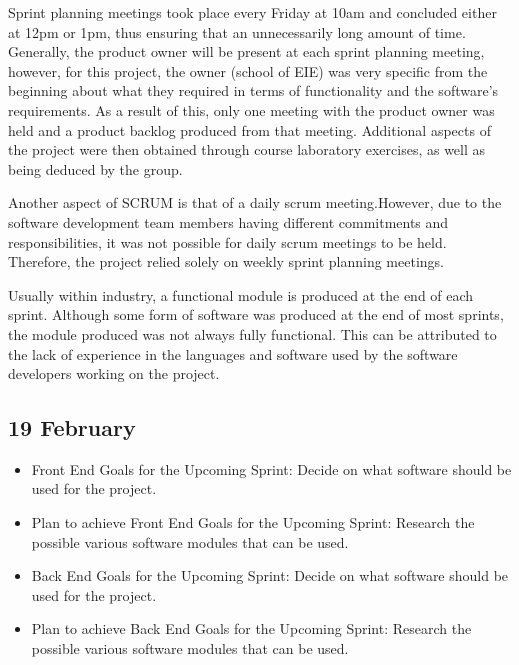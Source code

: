 \documentclass[journal,comsoc,onecolumn]{IEEEtran}
\begin{document}
\hfill \break Sprint planning meetings took place every Friday at 10am and concluded either at 12pm or 1pm, thus ensuring that an unnecessarily long amount of time. Generally, the product owner will be present at each sprint planning meeting, however, for this project, the owner (school of EIE) was very specific from the beginning about what they required in terms of functionality and the software's requirements. As a result of this, only one meeting with the product owner was held and a product backlog produced from that meeting. Additional aspects of the project were then obtained through course laboratory exercises, as well as being deduced by the group.

\hfill \break Another aspect of SCRUM is that of a daily scrum meeting.However, due to the software development team members having different commitments and responsibilities, it was not possible for daily scrum meetings to be held. Therefore, the project relied solely on weekly sprint planning meetings.

\hfill \break Usually within industry, a functional module is produced at the end of each sprint. Although some form of software was produced at the end of most sprints, the module produced was not always fully functional. This can be attributed to the lack of experience in the languages and software used by the software developers working on the project.


\subsection{19 February}

\begin{itemize}
	\item Front End Goals for the Upcoming Sprint: Decide on what software should be used for the project.
	\item Plan to achieve Front End Goals for the Upcoming Sprint: Research the possible various software modules that can be used.
	\item Back End Goals for the Upcoming Sprint: Decide on what software should be used for the project.
	\item Plan to achieve Back End Goals for the Upcoming Sprint: Research the possible various software modules that can be used.
\end{itemize}

\end{document}
